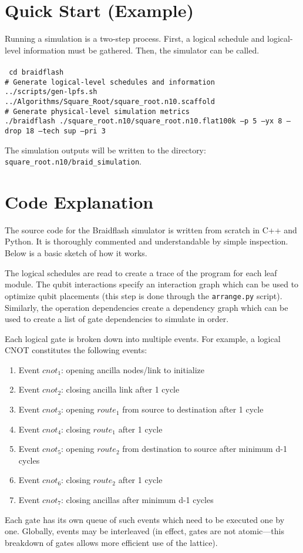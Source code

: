 \documentclass{article}
\begin{document}
\section{Quick Start (Example)}
Running a simulation is a two-step process. First, a logical schedule and logical-level information must be gathered. Then, the simulator can be called.
\\
\\
{\tt
cd braidflash\\
\# Generate logical-level schedules and information\\
../scripts/gen-lpfs.sh ../Algorithms/Square\_Root/square\_root.n10.scaffold\\
\# Generate physical-level simulation metrics\\
./braidflash ./square\_root.n10/square\_root.n10.flat100k --p 5 --yx 8 --drop 18 --tech sup --pri 3\\
}

The simulation outputs will be written to the directory:\\ 
{\tt square\_root.n10/braid\_simulation}.

\section{Code Explanation}
The source code for the Braidflash simulator is written from scratch in C++ and Python. It is thoroughly commented and understandable by simple inspection. Below is a basic sketch of how it works.

The logical schedules are read to create a trace of the program for each leaf module. The qubit interactions specify an interaction graph which can be used to optimize qubit placements (this step is done through the {\tt arrange.py} script). Similarly, the operation dependencies create a dependency graph which can be used to create a list of gate dependencies to simulate in order.

Each logical gate is broken down into multiple events. For example, a logical CNOT constitutes the following events:
\begin{enumerate}
\item Event $cnot_1$: opening ancilla nodes/link to initialize
\item Event $cnot_2$: closing ancilla link after 1 cycle
\item Event $cnot_3$: opening $route_1$ from source to destination after 1 cycle
\item Event $cnot_4$: closing $route_1$ after 1 cycle
\item Event $cnot_5$: opening $route_2$ from destination to source after minimum d-1 cycles
\item Event $cnot_6$: closing $route_2$ after 1 cycle
\item Event $cnot_7$: closing ancillas after minimum d-1 cycles
\end{enumerate}
Each gate has its own queue of such events which need to be executed one by one. Globally, events may be interleaved (in effect, gates are not atomic---this breakdown of gates allows more efficient use of the lattice).
\end{document}
